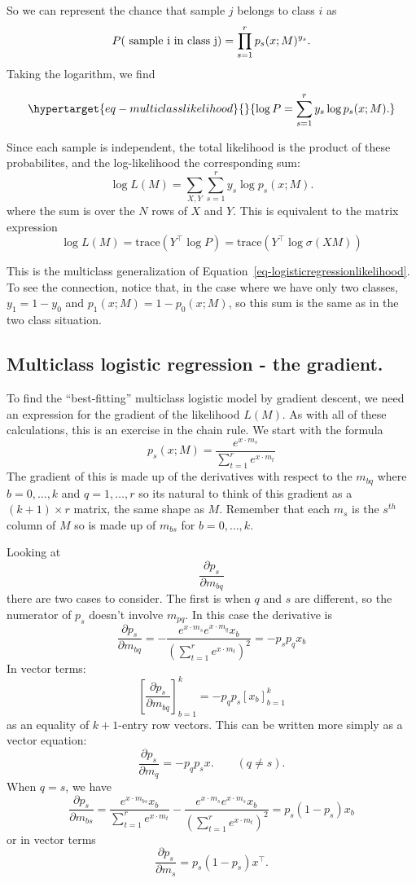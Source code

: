 \documentclass[
  11pt,
  letterpaper,
]{scrbook}
\theoremstyle{plain}
\theoremstyle{plain}
\theoremstyle{remark}
\begin{document}
So we can represent the chance that sample \(j\) belongs to class \(i\)
as \[
P(\hbox{ sample i in class j})=\prod_{s=1}^{r} p_{s}(x;M)^{y_{s}}.
\] Taking the logarithm, we find

\begin{equation}\protect\hypertarget{eq-multiclasslikelihood}{}{
\log P = \sum_{s=1}^{r} y_{s}\log p_{s}(x;M).
}\label{eq-multiclasslikelihood}\end{equation}

Since each sample is independent, the total likelihood is the product of
these probabilites, and the log-likelihood the corresponding sum: \[
\log L(M) = \sum_{X,Y} \sum_{s=1}^{r} y_{s}\log p_{s}(x;M).
\] where the sum is over the \(N\) rows of \(X\) and \(Y\). This is
equivalent to the matrix expression \[
\log L(M) = \mathrm{trace}(Y^{\intercal}\log P)=\mathrm{trace}(Y^{\intercal}\log\sigma(XM))
\]

This is the multiclass generalization of
Equation~\ref{eq-logisticregressionlikelihood}. To see the connection,
notice that, in the case where we have only two classes, \(y_1=1-y_0\)
and \(p_{1}(x;M)=1-p_{0}(x;M)\), so this sum is the same as in the two
class situation.

\hypertarget{multiclass-logistic-regression---the-gradient.}{%
\subsection{Multiclass logistic regression - the
gradient.}\label{multiclass-logistic-regression---the-gradient.}}

To find the ``best-fitting'' multiclass logistic model by gradient
descent, we need an expression for the gradient of the likelihood
\(L(M)\). As with all of these calculations, this is an exercise in the
chain rule. We start with the formula \[
p_{s}(x;M) = \frac{e^{x\cdot m_s}}{\sum_{t=1}^{r} e^{x\cdot m_{t}}}
\] The gradient of this is made up of the derivatives with respect to
the \(m_{bq}\) where \(b=0,\ldots, k\) and \(q=1,\dots, r\) so its
natural to think of this gradient as a \((k+1)\times r\) matrix, the
same shape as \(M\). Remember that each \(m_s\) is the \(s^{th}\) column
of \(M\) so is made up of \(m_{bs}\) for \(b=0,\ldots, k\).

Looking at \[
\frac{\partial p_{s}}{\partial m_{bq}}
\] there are two cases to consider. The first is when \(q\) and \(s\)
are different, so the numerator of \(p_{s}\) doesn't involve \(m_{pq}\).
In this case the derivative is \[
\frac{\partial p_{s}}{\partial m_{bq}}=-\frac{e^{x\cdot m_{s}}e^{x\cdot m_{q}}x_b}{(\sum_{t=1}^{r} e^{x\cdot m_{t}})^2}=-p_{s}p_{q}x_{b}
\] In vector terms: \[
[\frac{\partial p_{s}}{\partial m_{bq}}]_{b=1}^{k}=-p_{q}p_{s}[x_{b}]_{b=1}^{k}
\] as an equality of \(k+1\)-entry row vectors. This can be written more
simply as a vector equation: \[
\frac{\partial p_{s}}{\partial m_{q}}=-p_{q}p_{s}x.\qquad (q\not=s).
\] When \(q=s\), we have \[
\frac{\partial p_{s}}{\partial m_{bs}}
=\frac{e^{x\cdot m_{bs}}x_b}{\sum_{t=1}^{r}e^{x\cdot m_{t}}}-\frac{e^{x\cdot m_{s}}e^{x\cdot m_{s}}x_b}{(\sum_{t=1}^{r} e^{x\cdot m_{t}})^2}=p_{s}(1-p_{s})x_b
\] or in vector terms \[
\frac{\partial p_{s}}{\partial m_{s}}=p_{s}(1-p_{s})x^{\intercal}.
\]
\end{document}
